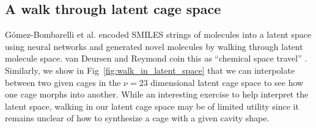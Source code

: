 \documentclass[journal=jacsat,manuscript=article,layout=traditional]{achemso}
\begin{document}
\subsection{A walk through latent cage space}
G\'{o}mez-Bombarelli et al. \cite{gomez2018automatic} encoded SMILES strings of molecules into a latent space using neural networks and generated novel molecules by walking through latent molecule space. van Deursen and Reymond coin this as ``chemical space travel'' \cite{van2007chemical}. Similarly, we show in Fig~\ref{fig:walk_in_latent_space} that we can interpolate between two given cages in the $\nu=23$ dimensional latent cage space to see how one cage morphs into another.
While an interesting exercise to help interpret the latent space, walking in our latent cage space may be of limited utility since it remains unclear of how to synthesize a cage with a given cavity shape.
\end{document}
